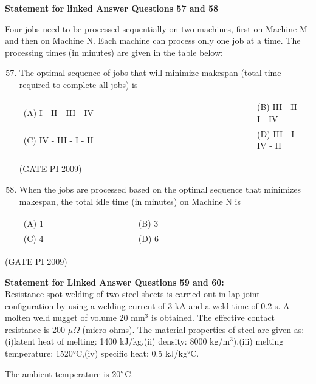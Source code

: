 \documentclass[journal,12pt,onecolumn]{IEEEtran}
\theoremstyle{remark}
\begin{document}
\textbf{Statement for linked Answer Questions 57 and 58}

 Four jobs need to be processed sequentially on two machines, first on Machine M and then on Machine N. Each machine can process only one job at a time. The processing times (in minutes) are given in the table below:

\begin{enumerate}[label=Q.\arabic*, leftmargin=*]
\setcounter{enumi}{56}
\item The optimal sequence of jobs that will minimize makespan (total time required to complete all jobs) is
\begin{multicols}{2}
\begin{tabular}[t]{p{0.8\linewidth} p{0.9\linewidth}}
(A) I - II - III - IV & (B) III - II - I - IV \\
(C) IV - III - I - II & (D) III - I - IV - II \\
\end{tabular}
\end{multicols}
\hfill (GATE PI 2009)
\item When the jobs are processed based on the optimal sequence that minimizes makespan, the total idle time (in minutes) on Machine N is
\begin{multicols}{2}
\begin{tabular}[t]{p{0.8\linewidth} p{0.9\linewidth}}
(A) 1 & (B) 3 \\
(C) 4 & (D) 6 \\
\end{tabular}
\end{multicols}
\end{enumerate}
\hfill (GATE PI 2009)

\textbf{Statement for Linked Answer Questions 59 and 60:} \\
Resistance spot welding of two steel sheets is carried out in lap joint configuration by using a welding current of 3 kA and a weld time of 0.2 s. A molten weld nugget of volume 20 mm$^3$ is obtained. The effective contact resistance is 200 $\mu\Omega$ (micro-ohms). The material properties of steel are given as: (i)latent heat of melting: 1400 kJ/kg,(ii) density: 8000 kg/m$^3$),(iii) melting temperature: 1520°C,(iv) specific heat: 0.5 kJ/kg°C.

The ambient temperature is 20$\degree$C.
\end{document}
